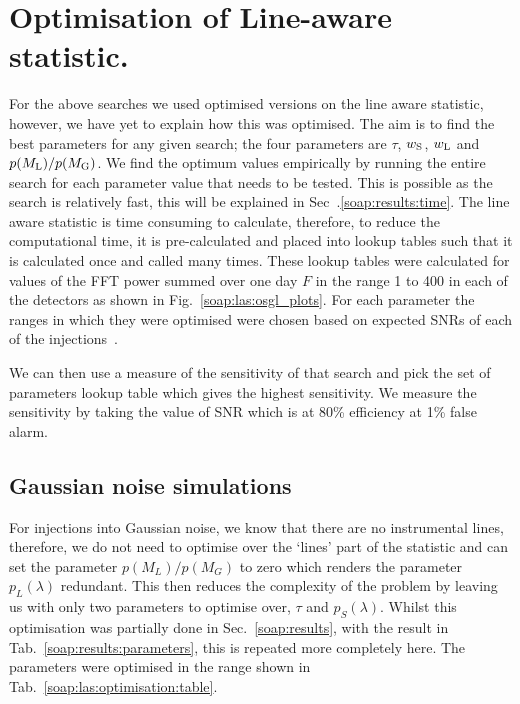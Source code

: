 \section{\label{soap:las:optimisation}Optimisation of Line-aware statistic.}

For the above searches we used optimised versions on the line aware statistic,
however, we have yet to explain how this was optimised.  The aim is to find the
best parameters for any given search; the four parameters are
$\tau$, $w_{\rm{S}}$, $w_{\rm{L}}$ and $p(M_{\rm{L}})/p(M_{\rm{G}})$.  We find
the optimum values empirically by running the entire search for each parameter
value that needs to be tested. This is possible as the search is relatively
fast, this will be explained in Sec~.\ref{soap:results:time}.  The line aware
statistic is time consuming to calculate, therefore, to reduce the
computational time, it is pre-calculated and placed into lookup tables such
that it is calculated once and called many times.  These lookup tables were
calculated for values of the \gls{FFT} power summed over one day $F$ in the range 1 to 400 in each of
the detectors as shown in Fig.~\ref{soap:las:osgl_plots}. For each parameter
the ranges in which they were optimised were chosen based on expected
\glspl{SNR} of each of the injections~. 

We can then use a measure of the sensitivity of that search and pick the set of parameters lookup
table which gives the highest sensitivity. 
We measure the sensitivity by taking the value of \gls{SNR} which is at 80\% efficiency at 1\% false alarm. 

\subsection{Gaussian noise simulations}

For injections into Gaussian noise, we know that there are no instrumental
lines, therefore, we do not need to optimise over the `lines' part of the
statistic and can set the parameter $p(M_L)/p(M_G)$ to zero which renders the
parameter $p_L(\lambda)$ redundant. 
This then reduces the complexity of the problem by leaving us with only two parameters to optimise over, $\tau$ and $p_S(\lambda)$. 
Whilst this optimisation was partially done in Sec.~\ref{soap:results}, with the result in Tab.~\ref{soap:results:parameters}, this is repeated more completely here.
The parameters were optimised in the range shown in Tab.~\ref{soap:las:optimisation:table}. 

